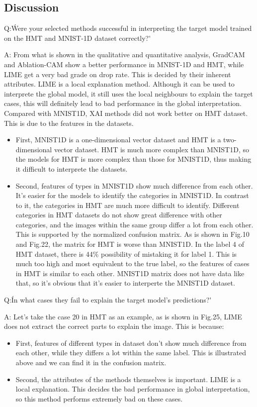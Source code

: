 \documentclass[conference]{IEEEtran}
\begin{document}
\subsection{Discussion}
Q:\'Were your selected methods successful in interpreting the target model trained on the HMT and MNIST-1D dataset correctly?\'\par
A: From what is shown in the qualitative and quantitative analysis, GradCAM and Ablation-CAM show a better performance in MNIST-1D and HMT, while LIME get a very bad grade on drop rate. This is decided by their inherent attributes. LIME is a local explanation method. Although it can be used to interprete the global model, it still uses the local neighbours to explain the target cases, this will definitely lead to bad performance in the global interpretation.
Compared with MNIST1D, XAI methods did not work better on HMT dataset. This is due to the features in the datasets. 
\begin{itemize}
	\item First, MNIST1D is a one-dimensional vector dataset and HMT is a two-dimensional vector dataset. HMT is much more complex than MNIST1D, so the models for HMT is more complex than those for MNIST1D, thus making it difficult to interprete the datasets.
	\item Second, features of types in MNIST1D show much difference from each other. It's easier for the models to identify the categories in MNIST1D. 
	In contrast to it, the categories in HMT are much more difficult to identify. Different categories in HMT datasets do not show great difference with other categories, and the images within the same group differ a lot from each other.
	This is supported by the normalized confusion matrix. 
	As is shown in Fig.10 and Fig.22, the matrix for HMT is worse than MNIST1D. In the label 4 of HMT dataset, there is 44\% possibility of mistaking it for label 1. This is much too high and most equivalent to the true label, so the features of cases in HMT is similar to each other. MNIST1D matrix does not have data like that, so it's obvious that it's easier to interperte the MNIST1D dataset.
\end{itemize}
Q:\'In what cases they fail to explain the target model’s predictions?\'\par
A: Let's take the case 20 in HMT as an example, as is shown in Fig.25, LIME does not extract the correct parts to explain the image. This is because:
\begin{itemize}
	\item First, features of different types in dataset don't show much difference from each other, while they differs a lot within the same label. This is illustrated above and we can find it in the confusion matrix.
	\item Second, the attributes of the methods themselves is important. LIME is a local explanation. This decides the bad performance in global interpretation, so this method performs extremely bad on these cases.
\end{itemize}
\end{document}
